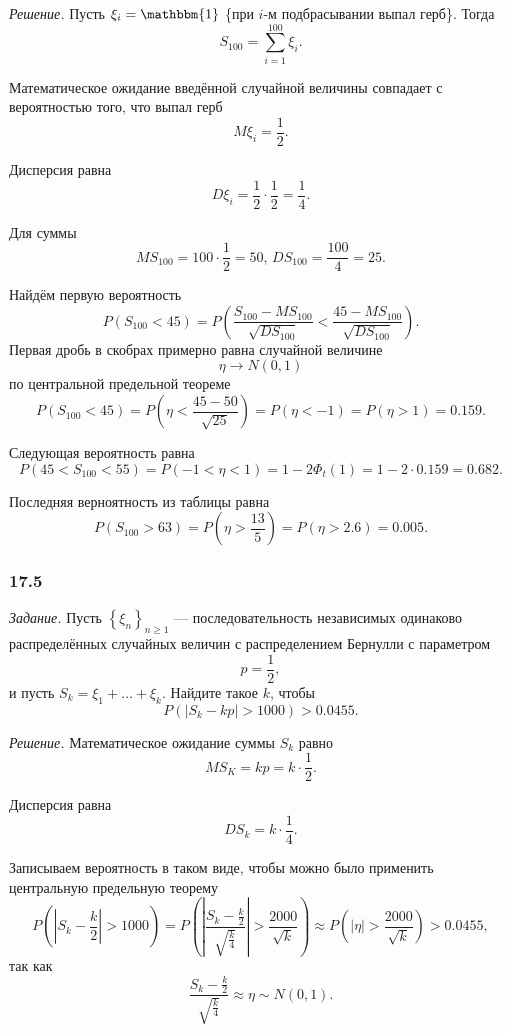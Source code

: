 \textit{Решение.} Пусть $ \xi_i = \mathbbm{1}$ \{при $i$-м подбрасывании выпал герб\}.
Тогда
$$S_{100} =
  \sum \limits_{i = 1}^{100} \xi_i.$$

Математическое ожидание введённой случайной величины совпадает с вероятностью того, что выпал герб
$$M \xi_i =
 \frac{1}{2}.$$

Дисперсия равна
$$D \xi_i =
  \frac{1}{2} \cdot \frac{1}{2} =
  \frac{1}{4}.$$

Для суммы
$$MS_{100} = 100 \cdot \frac{1}{2} = 50, \,
  DS_{100} = \frac{100}{4} = 25.$$

Найдём первую вероятность
$$P \left( S_{100} < 45 \right) =
  P \left(
      \frac{S_{100} - MS_{100}}{ \sqrt{DS_{100}}} < \frac{45 - MS_{100}}{ \sqrt{DS_{100}}}
    \right).$$
Первая дробь в скобрах примерно равна случайной величине
$$ \eta \to
  N \left( 0, 1 \right)$$
по центральной предельной теореме
$$P \left( S_{100} < 45 \right) =
  P \left( \eta < \frac{45 - 50}{ \sqrt{25}} \right) =
  P \left( \eta < -1 \right) =
  P \left( \eta > 1 \right) =
  0.159.$$

Следующая вероятность равна
$$P \left( 45 < S_{100} < 55 \right) =
  P \left( -1 < \eta < 1 \right) =
  1 - 2 \Phi_t \left( 1 \right) =
  1 - 2 \cdot 0.159 =
  0.682.$$

Последняя верноятность из таблицы равна
$$P \left( S_{100} > 63 \right) =
  P \left( \eta > \frac{13}{5} \right) =
  P \left( \eta > 2.6 \right) =
  0.005.$$

\subsubsection*{17.5}

\textit{Задание.}
Пусть $ \left\{ \xi_n \right\}_{n \geq 1}$ ---
последовательность независимых одинаково распределённых
случайных величин с распределением Бернулли с параметром
$$p =
  \frac{1}{2},$$
и пусть $S_k = \xi_1 + \dotsc + \xi_k$.
Найдите такое $k$, чтобы
$$P \left( \left| S_k - kp \right| > 1000 \right) >
  0.0455.$$

\textit{Решение.} Математическое ожидание суммы $S_k$ равно
$$MS_K =
  kp =
  k \cdot \frac{1}{2}.$$

Дисперсия равна
$$DS_k =
  k \cdot \frac{1}{4}.$$

Записываем вероятность в таком виде, чтобы можно было применить центральную предельную теорему
$$P \left( \left| S_k - \frac{k}{2} \right| > 1000 \right) =
  P \left(
      \left| \frac{S_k - \frac{k}{2}}{ \sqrt{ \frac{k}{4}}} \right| > \frac{2000}{ \sqrt{k}}
    \right) \approx
  P \left( \left| \eta \right| > \frac{2000}{ \sqrt{k}} \right) >
  0.0455,$$
так как
$$ \frac{S_k - \frac{k}{2}}{ \sqrt{ \frac{k}{4}}} \approx
  \eta \sim
  N \left( 0, 1 \right).$$

